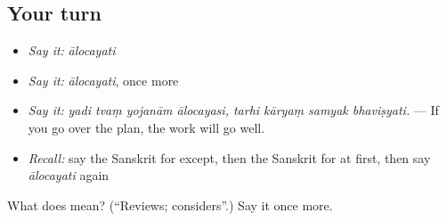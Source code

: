 \subsection*{Your turn}
\begin{itemize}
\raggedright
  \item \emph{Say it:} \emph{ālocayati}
  \item \emph{Say it:} \emph{ālocayati}, once more
  \item \emph{Say it:} \emph{yadi tvaṃ yojanām ālocayasi, tarhi kāryaṃ samyak bhaviṣyati.} — If you go over the plan, the work will go well.
  \item \emph{Recall:} say the Sanskrit for except, then the Sanskrit for at first, then say \emph{ālocayati} again
\end{itemize}

\begin{tcolorbox}[breakable,colback=teal!4,colframe=teal!35!black,title={Before you move on}]
What does  mean? (\textquotedblleft{}Reviews; considers\textquotedblright{}.) Say it once more.
\end{tcolorbox}
